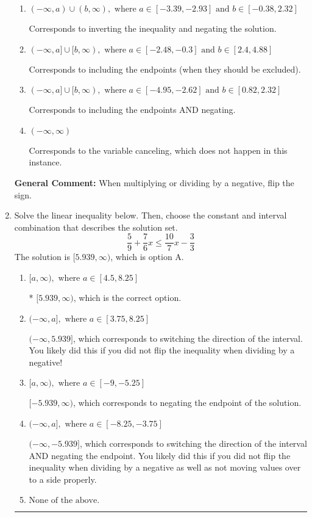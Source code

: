 \documentclass{extbook}[14pt]
\newcommand{\litem}[1]{\item #1

\rule{\textwidth}{0.4pt}}
\begin{document}
\begin{enumerate}
{\begin{enumerate}[label=\Alph*.]
 * Correct option.
\item \( (-\infty, a) \cup (b, \infty), \text{ where } a \in [-3.39, -2.93] \text{ and } b \in [-0.38, 2.32] \)

Corresponds to inverting the inequality and negating the solution.
\item \( (-\infty, a] \cup [b, \infty), \text{ where } a \in [-2.48, -0.3] \text{ and } b \in [2.4, 4.88] \)

Corresponds to including the endpoints (when they should be excluded).
\item \( (-\infty, a] \cup [b, \infty), \text{ where } a \in [-4.95, -2.62] \text{ and } b \in [0.82, 2.32] \)

Corresponds to including the endpoints AND negating.
\item \( (-\infty, \infty) \)

Corresponds to the variable canceling, which does not happen in this instance.
\end{enumerate}

\textbf{General Comment:} When multiplying or dividing by a negative, flip the sign.
}
\litem{
Solve the linear inequality below. Then, choose the constant and interval combination that describes the solution set.
\[ \frac{5}{9} + \frac{7}{6} x \leq \frac{10}{7} x - \frac{3}{3} \]The solution is \( [5.939, \infty) \), which is option A.\begin{enumerate}[label=\Alph*.]
\item \( [a, \infty), \text{ where } a \in [4.5, 8.25] \)

* $[5.939, \infty)$, which is the correct option.
\item \( (-\infty, a], \text{ where } a \in [3.75, 8.25] \)

 $(-\infty, 5.939]$, which corresponds to switching the direction of the interval. You likely did this if you did not flip the inequality when dividing by a negative!
\item \( [a, \infty), \text{ where } a \in [-9, -5.25] \)

 $[-5.939, \infty)$, which corresponds to negating the endpoint of the solution.
\item \( (-\infty, a], \text{ where } a \in [-8.25, -3.75] \)

 $(-\infty, -5.939]$, which corresponds to switching the direction of the interval AND negating the endpoint. You likely did this if you did not flip the inequality when dividing by a negative as well as not moving values over to a side properly.
\item \( \text{None of the above}. \)


\end{enumerate}}
\end{enumerate}
\end{document}
